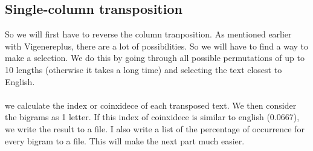 \documentclass{article}
\begin{document}
\subsection{Single-column transposition}
So we will first have to reverse the column tranposition. As mentioned earlier with Vigenereplus, there are a lot of possibilities. So we will have to find a way to make a selection. We do this by going through all possible permutations of up to 10 lengths (otherwise it takes a long time) and selecting the text closest to English.\\
\\
we calculate the index or coinxidece of each transposed text. We then consider the bigrams as 1 letter. If this index of coinxidece is similar to english (0.0667), we write the result to a file. I also write a list of the percentage of occurrence for every bigram to a file. This will make the next part much easier.
\end{document}
